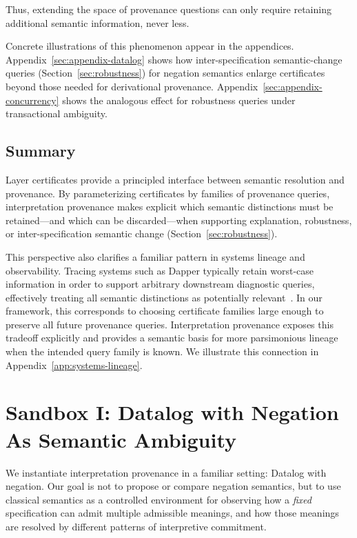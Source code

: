\documentclass[acmsmall,nonacm]{acmart}
\theoremstyle{remark}
\numberwithin{definition}{section}
\numberwithin{theorem}{section}
\numberwithin{lemma}{section}
\numberwithin{corollary}{section}
\numberwithin{remark}{section}
\numberwithin{example}{section}
\numberwithin{observation}{section}
\numberwithin{assumption}{section}
\begin{document}
\noindent
Thus, extending the space of provenance questions can only require retaining
additional semantic information, never less.

Concrete illustrations of this phenomenon appear in the appendices.
Appendix~\ref{sec:appendix-datalog} shows how inter-specification semantic-change queries
(Section~\ref{sec:robustness}) for negation semantics enlarge certificates beyond
those needed for derivational provenance.
Appendix~\ref{sec:appendix-concurrency} shows the analogous effect for robustness
queries under transactional ambiguity.

\subsection{Summary}

Layer certificates provide a principled interface between semantic resolution and
provenance.
By parameterizing certificates by families of provenance queries,
interpretation provenance makes explicit which semantic distinctions must be
retained—and which can be discarded—when supporting explanation, robustness, or
inter-specification semantic change (Section~\ref{sec:robustness}).

This perspective also clarifies a familiar pattern in systems lineage and
observability.
Tracing systems such as Dapper typically retain worst-case information in order to
support arbitrary downstream diagnostic queries, effectively treating all
semantic distinctions as potentially relevant~\cite{sigelman2010dapper}.
In our framework, this corresponds to choosing certificate families large enough
to preserve all future provenance queries.
Interpretation provenance exposes this tradeoff explicitly and provides a semantic
basis for more parsimonious lineage when the intended query family is known.
We illustrate this connection in Appendix~\ref{app:systems-lineage}.

\section{Sandbox I: Datalog with Negation As Semantic Ambiguity}
\label{sec:negation}

We instantiate interpretation provenance in a familiar setting: Datalog with
negation.
Our goal is not to propose or compare negation semantics, but to use classical
semantics as a controlled environment for observing how a \emph{fixed}
specification can admit multiple admissible meanings, and how those meanings are
resolved by different patterns of interpretive commitment.
\end{document}
